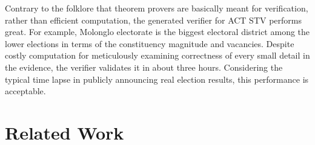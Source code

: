 \documentclass[10pt,conference]{IEEEtran}
\begin{document}
Contrary to the folklore that theorem provers are basically meant for verification, rather than efficient computation, the generated verifier for ACT STV performs great. For example, Molonglo electorate is the biggest electoral district among the lower elections in terms of the constituency magnitude and vacancies. Despite  costly computation for meticulously examining correctness of every small detail in the evidence, the verifier validates it in about three hours. Considering the typical time lapse in publicly announcing real election results, this performance is acceptable.  
\section{Related Work}



\end{document}
